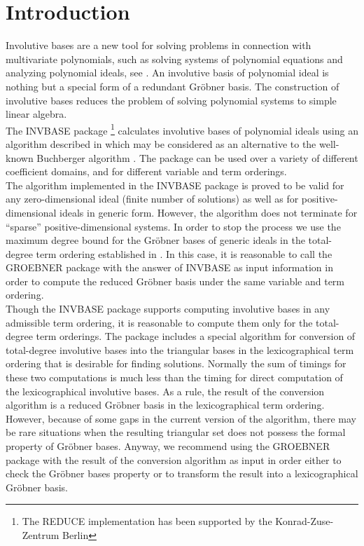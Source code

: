 \section{Introduction}
Involutive bases are a new tool for solving problems in connection with
multivariate polynomials, such as solving systems of polynomial equations
and analyzing polynomial ideals, see \cite{Lille}. An involutive basis of
polynomial ideal is nothing but a special form of a redundant Gr\"obner
basis. The construction of involutive bases reduces the problem of solving
polynomial systems to simple linear algebra.\\
The INVBASE package
\footnote{The REDUCE implementation has been supported by
the Konrad-Zuse-Zentrum Berlin}
calculates involutive bases of polynomial ideals
using an algorithm described in \cite{Lille}
which may be considered as an alternative to
the well-known Buchberger algorithm \cite{Buch}.
The package can be used over
a variety of different coefficient domains, and for different variable
and term orderings.\\
The algorithm implemented in the INVBASE package is proved
to be valid for any zero-dimensional ideal (finite number of solutions)
as well as for positive-dimensional ideals in generic form. However,
the algorithm does not terminate for ``sparse'' positive-dimensional systems.
In order to stop the process we use the maximum degree
bound for the Gr\"obner bases of generic ideals in the total-degree
term ordering established in \cite{Laz}.
In this case, it is reasonable
to call the GROEBNER package with the answer of INVBASE as input
information in order to compute the reduced Gr\"obner basis under the
same variable and term ordering.\\
Though the INVBASE package supports computing involutive bases in any
admissible term ordering,
it is reasonable to compute them only for the total-degree term
orderings. The package includes a special algorithm for conversion
of total-degree involutive bases into the triangular bases
in the lexicographical term ordering that is desirable for
finding solutions. Normally the sum of timings for these two
computations is much less than the timing for direct computation
of the lexicographical involutive bases. As a rule, the result
of the conversion algorithm is a reduced Gr\"obner basis in the
lexicographical term ordering. However, because of some gaps in
the current version of the algorithm,
there may be rare situations when the resulting triangular set
does not possess the formal property of Gr\"obner bases.
Anyway, we recommend using the GROEBNER package with the result
of the conversion algorithm as input in order either to check
the Gr\"obner bases property or to transform the result into a
lexicographical Gr\"obner basis.

